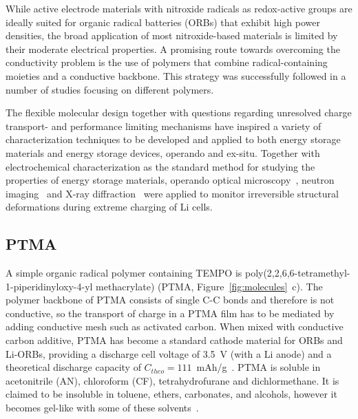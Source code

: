 \par
While active electrode materials with nitroxide radicals as redox-active groups are ideally suited for organic radical batteries (ORBs) that exhibit high power densities, the broad application of most nitroxide-based materials is limited by their moderate electrical properties. A promising route towards overcoming the conductivity problem is the use of polymers that combine radical-containing moieties and a conductive backbone. This strategy was successfully followed in a number of studies focusing on different polymers.\cite{oyaizu2015_polymerjournal, bahaceci2013_jpowersources, katsumata2006_mrc, xu2014_electact, aydin2015_jsoistatelect, schwartz2018_synthmet}

\par

The flexible molecular design together with questions regarding unresolved charge transport- and performance limiting mechanisms have inspired a variety of characterization techniques to be developed and applied to both energy storage materials and energy storage devices, operando and ex-situ. Together with electrochemical characterization as the standard method for studying the properties of energy storage materials\cite{IWASA2007,Zens2022}, operando optical microscopy~\cite{Merryweather2022}, neutron imaging~\cite{Ma2020} and X-ray diffraction~\cite{Rhodes2012} were applied to monitor irreversible structural deformations during extreme charging of Li cells.

\subsection{PTMA}

A simple organic radical polymer containing TEMPO is poly(2,2,6,6-tetramethyl-1-piperidinyloxy-4-yl methacrylate) (PTMA, Figure~\ref{fig:molecules}~c). The polymer backbone of PTMA consists of single C-C bonds and therefore is not conductive, so the transport of charge in a PTMA film has to be mediated by adding conductive mesh such as activated carbon. When mixed with conductive carbon additive, PTMA has become a standard cathode material for ORBs and Li-ORBs, providing a discharge cell voltage of 3.5~V (with a Li anode) and a theoretical discharge capacity of $C_{theo}=111$~mAh/g~\cite{Daniel2023_Multimodal}. PTMA is soluble in acetonitrile (AN), chloroform (CF), tetrahydrofurane and dichlormethane. It is claimed to be insoluble in toluene, ethers, carbonates, and alcohols, however it becomes gel-like with some of these solvents~\cite{DOM}.


